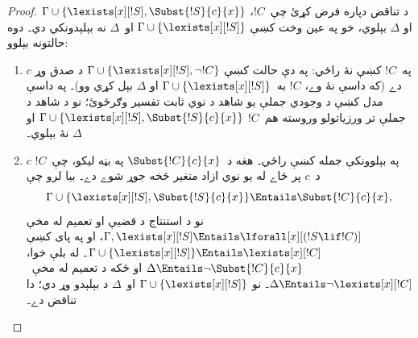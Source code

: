 \documentclass[../../../include/open-logic-section]{subfiles}
\begin{document}
\begin{proof}
د تناقض دپاره فرض کړئ چې~$!C$،
$\Gamma \cup \{\lexists[x][!S], \Subst{!S}{c}{x}\}$ او
$\Delta$ بېلوي، خو په عين وخت کښې
$\Gamma \cup \{\lexists[x][!S] \}$ او~$\Delta$ نه بېلېدونکي دي۔
دوه حالتونه بېلوو:
\begin{enumerate}
\item $c$ په~$!C$ کښې نۀ راځي: په دې حالت کښې
  $\Gamma \cup \{\lexists[x][!S], \lnot!C \}$ د صدق وړ دے (که
  داسې نۀ وے، $!C$ به~$\Gamma \cup \{\lexists[x][!S] \}$ او
  $\Delta$ بېل کړي وو)۔ په داسې مدل کښې د وجودي جملې يو شاهد د نوي ثابت تفسير
  وګرځوئ؛ نو د شاهد د جملې تر ورزياتولو وروسته هم~$!C$
  $\Gamma \cup \{ \lexists[x][!S], \Subst{!S}{c}{x} \}$ او
  $\Delta$ نۀ بېلوي۔
\item $c$ په بېلوونکې جمله کښې راځي۔ هغه د~$\Subst{!C}{c}{x}$ په بڼه ليکو،
  چې~$!C$ د~$c$ پر ځاے له يو نوي ازاد متغير څخه جوړ شوے دے۔ بيا لرو چې
  \[
  \Gamma \cup \{ \lexists[x][!S], \Subst{!S}{c}{x}\} \Entails \Subst{!C}{c}{x},
  \]
  نو د استنتاج د قضيې او تعميم له مخې
  $\Gamma, \lexists[x][!S] \Entails \lforall[x][(!S \lif !C)]$،
  او په پای کښې
  $\Gamma \cup \{ \lexists[x][!S] \} \Entails \lexists[x][!C]$۔
  له بلې خوا، $\Delta \Entails \lnot \Subst{!C}{c}{x}$ او ځکه د
  تعميم له مخې~$\Delta \Entails \lnot \lexists[x][!C]$۔ نو
  $\Gamma \cup \{\lexists[x][!S] \}$ او~$\Delta$ د بېلېدو وړ دي؛
  دا تناقض دے۔
\end{enumerate}
\end{proof}
\end{document}
